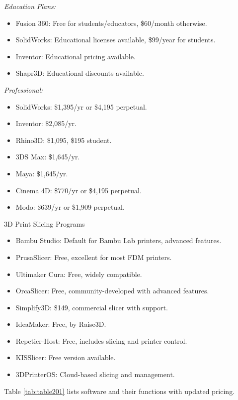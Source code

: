 \textit{Education Plans:}
\begin{itemize}
    \item Fusion 360: Free for students/educators, \$60/month otherwise.
    \item SolidWorks: Educational licenses available, \$99/year for students.
    \item Inventor: Educational pricing available.
    \item Shapr3D: Educational discounts available.
\end{itemize}

\textit{Professional:}
\begin{itemize}
    \item SolidWorks: \$1,395/yr or \$4,195 perpetual.
    \item Inventor: \$2,085/yr.
    \item Rhino3D: \$1,095, \$195 student.
    \item 3DS Max: \$1,645/yr.
    \item Maya: \$1,645/yr.
    \item Cinema 4D: \$770/yr or \$4,195 perpetual.
    \item Modo: \$639/yr or \$1,909 perpetual.
\end{itemize}

3D Print Slicing Programs
\begin{itemize}
    \item Bambu Studio: Default for Bambu Lab printers, advanced features.
    \item PrusaSlicer: Free, excellent for most FDM printers.
    \item Ultimaker Cura: Free, widely compatible.
    \item OrcaSlicer: Free, community-developed with advanced features.
    \item Simplify3D: \$149, commercial slicer with support.
    \item IdeaMaker: Free, by Raise3D.
    \item Repetier-Host: Free, includes slicing and printer control.
    \item KISSlicer: Free version available.
    \item 3DPrinterOS: Cloud-based slicing and management.
\end{itemize}

Table \ref{tab:table201} lists software and their functions with updated pricing.

